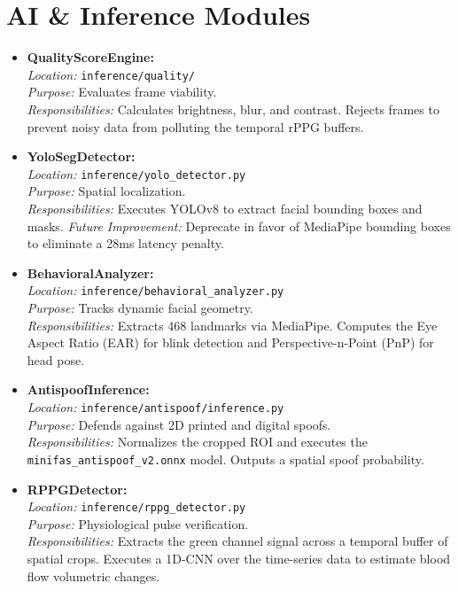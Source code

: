 \documentclass[12pt, a4paper]{report}
\begin{document}
\section{AI \& Inference Modules}
\begin{itemize}
    \item \textbf{QualityScoreEngine:} \\
    \textit{Location:} \texttt{inference/quality/} \\
    \textit{Purpose:} Evaluates frame viability. \\
    \textit{Responsibilities:} Calculates brightness, blur, and contrast. Rejects frames to prevent noisy data from polluting the temporal rPPG buffers.
    
    \item \textbf{YoloSegDetector:} \\
    \textit{Location:} \texttt{inference/yolo\_detector.py} \\
    \textit{Purpose:} Spatial localization. \\
    \textit{Responsibilities:} Executes YOLOv8 to extract facial bounding boxes and masks. \textit{Future Improvement:} Deprecate in favor of MediaPipe bounding boxes to eliminate a 28ms latency penalty.
    
    \item \textbf{BehavioralAnalyzer:} \\
    \textit{Location:} \texttt{inference/behavioral\_analyzer.py} \\
    \textit{Purpose:} Tracks dynamic facial geometry. \\
    \textit{Responsibilities:} Extracts 468 landmarks via MediaPipe. Computes the Eye Aspect Ratio (EAR) for blink detection and Perspective-n-Point (PnP) for head pose.
    
    \item \textbf{AntispoofInference:} \\
    \textit{Location:} \texttt{inference/antispoof/inference.py} \\
    \textit{Purpose:} Defends against 2D printed and digital spoofs. \\
    \textit{Responsibilities:} Normalizes the cropped ROI and executes the \texttt{minifas\_antispoof\_v2.onnx} model. Outputs a spatial spoof probability.
    
    \item \textbf{RPPGDetector:} \\
    \textit{Location:} \texttt{inference/rppg\_detector.py} \\
    \textit{Purpose:} Physiological pulse verification. \\
    \textit{Responsibilities:} Extracts the green channel signal across a temporal buffer of spatial crops. Executes a 1D-CNN over the time-series data to estimate blood flow volumetric changes.
    

\end{itemize}
\end{document}

